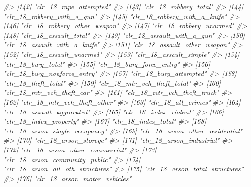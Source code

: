 \documentclass[
]{krantz}
\makeatletter
\newenvironment{Shaded}{\begin{snugshade}}{\end{snugshade}}
\newcommand{\CommentTok}[1]{\textcolor[rgb]{0.37,0.37,0.37}{\textit{#1}}}
\newenvironment{kframe}{%
\medskip{}
\setlength{\fboxsep}{.8em}
 \def\at@end@of@kframe{}%
 \ifinner\ifhmode%
  \def\at@end@of@kframe{\end{minipage}}%
  \begin{minipage}{\columnwidth}%
 \fi\fi%
 \def\FrameCommand##1{\hskip\@totalleftmargin \hskip-\fboxsep
 \colorbox{shadecolor}{##1}\hskip-\fboxsep
     \hskip-\linewidth \hskip-\@totalleftmargin \hskip\columnwidth}%
 \MakeFramed {\advance\hsize-\width
   \@totalleftmargin\z@ \linewidth\hsize
   \@setminipage}}%
 {\par\unskip\endMakeFramed%
 \at@end@of@kframe}
\renewenvironment{Shaded}{\begin{kframe}}{\end{kframe}}
\makeatother
\begin{document}
\begin{Shaded}
\begin{Highlighting}[]
\CommentTok{\#\textgreater{} [142] "clr\_18\_rape\_attempted"           }
\CommentTok{\#\textgreater{} [143] "clr\_18\_robbery\_total"            }
\CommentTok{\#\textgreater{} [144] "clr\_18\_robbery\_with\_a\_gun"       }
\CommentTok{\#\textgreater{} [145] "clr\_18\_robbery\_with\_a\_knife"     }
\CommentTok{\#\textgreater{} [146] "clr\_18\_robbery\_other\_weapon"     }
\CommentTok{\#\textgreater{} [147] "clr\_18\_robbery\_unarmed"          }
\CommentTok{\#\textgreater{} [148] "clr\_18\_assault\_total"            }
\CommentTok{\#\textgreater{} [149] "clr\_18\_assault\_with\_a\_gun"       }
\CommentTok{\#\textgreater{} [150] "clr\_18\_assault\_with\_a\_knife"     }
\CommentTok{\#\textgreater{} [151] "clr\_18\_assault\_other\_weapon"     }
\CommentTok{\#\textgreater{} [152] "clr\_18\_assault\_unarmed"          }
\CommentTok{\#\textgreater{} [153] "clr\_18\_assault\_simple"           }
\CommentTok{\#\textgreater{} [154] "clr\_18\_burg\_total"               }
\CommentTok{\#\textgreater{} [155] "clr\_18\_burg\_force\_entry"         }
\CommentTok{\#\textgreater{} [156] "clr\_18\_burg\_nonforce\_entry"      }
\CommentTok{\#\textgreater{} [157] "clr\_18\_burg\_attempted"           }
\CommentTok{\#\textgreater{} [158] "clr\_18\_theft\_total"              }
\CommentTok{\#\textgreater{} [159] "clr\_18\_mtr\_veh\_theft\_total"      }
\CommentTok{\#\textgreater{} [160] "clr\_18\_mtr\_veh\_theft\_car"        }
\CommentTok{\#\textgreater{} [161] "clr\_18\_mtr\_veh\_theft\_truck"      }
\CommentTok{\#\textgreater{} [162] "clr\_18\_mtr\_veh\_theft\_other"      }
\CommentTok{\#\textgreater{} [163] "clr\_18\_all\_crimes"               }
\CommentTok{\#\textgreater{} [164] "clr\_18\_assault\_aggravated"       }
\CommentTok{\#\textgreater{} [165] "clr\_18\_index\_violent"            }
\CommentTok{\#\textgreater{} [166] "clr\_18\_index\_property"           }
\CommentTok{\#\textgreater{} [167] "clr\_18\_index\_total"              }
\CommentTok{\#\textgreater{} [168] "clr\_18\_arson\_single\_occupancy"   }
\CommentTok{\#\textgreater{} [169] "clr\_18\_arson\_other\_residential"  }
\CommentTok{\#\textgreater{} [170] "clr\_18\_arson\_storage"            }
\CommentTok{\#\textgreater{} [171] "clr\_18\_arson\_industrial"         }
\CommentTok{\#\textgreater{} [172] "clr\_18\_arson\_other\_commercial"   }
\CommentTok{\#\textgreater{} [173] "clr\_18\_arson\_community\_public"   }
\CommentTok{\#\textgreater{} [174] "clr\_18\_arson\_all\_oth\_structures" }
\CommentTok{\#\textgreater{} [175] "clr\_18\_arson\_total\_structures"   }
\CommentTok{\#\textgreater{} [176] "clr\_18\_arson\_motor\_vehicles"     }

\end{Highlighting}
\end{Shaded}
\end{document}
